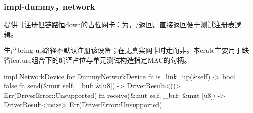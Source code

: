 
\subsubsection{impl-dummy，network}

提供可注册但链路恒down的占位网卡：为，/返回。直接返回便于测试注册表逻辑。

生产bring-up路径不默认注册该设备；在无真实网卡时走而非。本crate主要用于缺省feature组合下的编译占位与单元测试构造指定MAC的句柄。

\begin{rustcode}
impl NetworkDevice for DummyNetworkDevice {
    fn is_link_up(&self) -> bool { false }
    fn send(&mut self, _buf: &[u8]) -> DriverResult<()> {
        Err(DriverError::Unsupported)
    }
    fn receive(&mut self, _buf: &mut [u8]) -> DriverResult<usize> {
        Err(DriverError::Unsupported)
    }
}
\end{rustcode}
